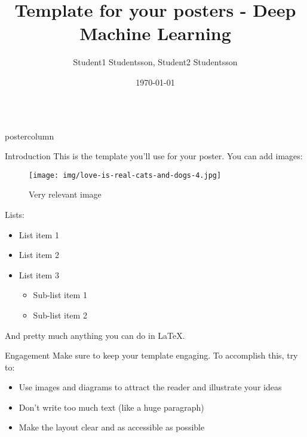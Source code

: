 \documentclass{beamer}
\title{\huge Template for your posters - Deep Machine Learning}
\author{Student1 Studentsson, Student2 Studentsson}
\institute[Chalmers]{Chalmers University of Technology \\ Electrical Engineering Department}
\date{\today}
\newlength{\columnheight}
\begin{document}
\begin{frame}
\begin{columns}
	\begin{column}{.43\textwidth}
		\begin{beamercolorbox}[center]{postercolumn}
			\begin{minipage}{.98\textwidth}  %
				\parbox[t][\columnheight]{\textwidth}{
					\begin{myblock}{Introduction}
				        This is the template you'll use for your poster. You can add images:

				        \begin{figure}
				            \centering
				            \texttt{[image: img/love-is-real-cats-and-dogs-4.jpg]}
				            \caption{Very relevant image}
				            \label{fig:my_label}
				        \end{figure}

				        Lists:

				        \begin{itemize}
				            \item List item 1
				            \item List item 2
				            \item List item 3
				            \begin{itemize}
				                \item Sub-list item 1
				                \item Sub-list item 2
				            \end{itemize}
				        \end{itemize}

				        And pretty much anything you can do in \LaTeX{}.


				    \end{myblock}\vfill
					\begin{myblock}{Engagement}
                        Make sure to keep your template engaging. To accomplish this, try to:
                        \begin{itemize}
                            \item Use images and diagrams to attract the reader and illustrate your ideas
                            \item Don't write too much text (like a huge paragraph)
                            \item Make the layout clear and as accessible as possible
                        \end{itemize}


\end{myblock}}
\end{minipage}
\end{beamercolorbox}
\end{column}
\end{columns}
\end{frame}
\end{document}
